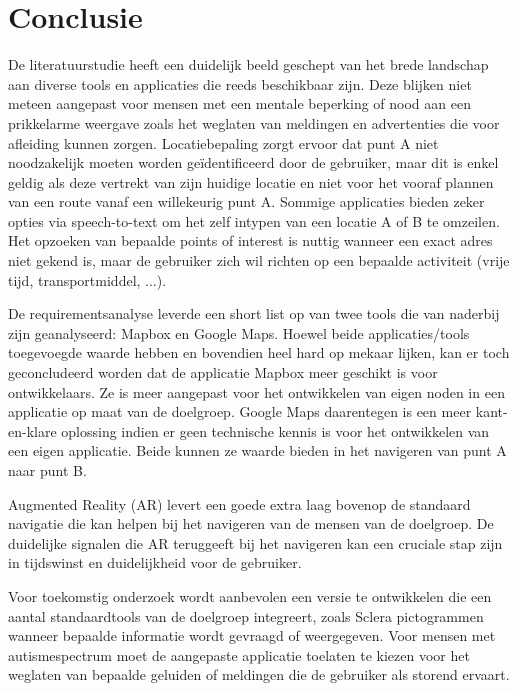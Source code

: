 
\chapter{Conclusie}%
\label{ch:conclusie}



De literatuurstudie heeft een duidelijk beeld geschept van het brede landschap aan diverse tools en applicaties die reeds beschikbaar zijn. Deze blijken niet meteen aangepast voor mensen met een mentale beperking of nood aan een prikkelarme weergave zoals het weglaten van meldingen en advertenties die voor afleiding kunnen zorgen. Locatiebepaling zorgt ervoor dat punt A niet noodzakelijk moeten worden geïdentificeerd door de gebruiker, maar dit is enkel geldig als deze vertrekt van zijn huidige locatie en niet voor het vooraf plannen van een route vanaf een willekeurig punt A. Sommige applicaties bieden zeker opties via speech-to-text om het zelf intypen van een locatie A of B te omzeilen. Het opzoeken van bepaalde points of interest is nuttig wanneer een exact adres niet gekend is, maar de gebruiker zich wil richten op een bepaalde activiteit (vrije tijd, transportmiddel, ...).  

De requirementsanalyse leverde een short list op van twee tools die van naderbij zijn geanalyseerd: Mapbox en Google Maps. Hoewel beide applicaties/tools toegevoegde waarde hebben en bovendien heel hard op mekaar lijken, kan er toch geconcludeerd worden dat de applicatie Mapbox meer geschikt is voor ontwikkelaars. Ze is meer aangepast voor het ontwikkelen van eigen noden in een applicatie op maat van de doelgroep. Google Maps daarentegen is een meer kant-en-klare oplossing indien er geen technische kennis is voor het ontwikkelen van een eigen applicatie. Beide kunnen ze waarde bieden in het navigeren van punt A naar punt B.

Augmented Reality (AR) levert een goede extra laag bovenop de standaard navigatie die kan helpen bij het navigeren van de mensen van de doelgroep. De duidelijke signalen die AR teruggeeft bij het navigeren kan een cruciale stap zijn in tijdswinst en duidelijkheid voor de gebruiker.

Voor toekomstig onderzoek wordt aanbevolen een versie te ontwikkelen die een aantal standaardtools van de doelgroep integreert, zoals Sclera pictogrammen wanneer bepaalde informatie wordt gevraagd of weergegeven. Voor mensen met autismespectrum moet de aangepaste applicatie toelaten te kiezen voor het weglaten van bepaalde geluiden of meldingen die de gebruiker als storend ervaart. 